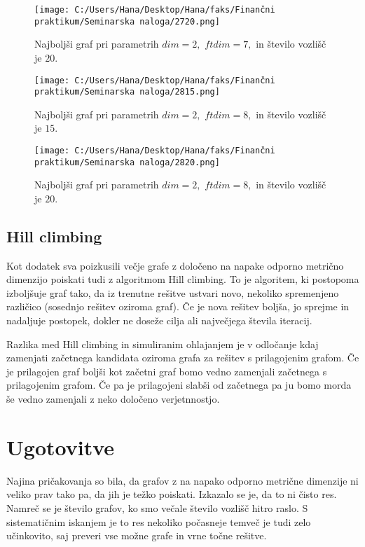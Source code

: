 \documentclass[12pt]{article}
\begin{document}
\begin{figure}[H]
    \centering
    \texttt{[image: C:/Users/Hana/Desktop/Hana/faks/Finančni praktikum/Seminarska naloga/2720.png]}
    \caption{Najboljši graf pri parametrih $dim = 2,$ $ftdim = 7,$ in število vozlišč je $20.$}
    \label{fig:slika2720}
\end{figure}


\begin{figure}[H]
    \centering
    \texttt{[image: C:/Users/Hana/Desktop/Hana/faks/Finančni praktikum/Seminarska naloga/2815.png]}
    \caption{Najboljši graf pri parametrih $dim = 2,$ $ftdim = 8,$ in število vozlišč je $15.$}
    \label{fig:slika2815}
\end{figure}

\begin{figure}[H]
    \centering
    \texttt{[image: C:/Users/Hana/Desktop/Hana/faks/Finančni praktikum/Seminarska naloga/2820.png]}
    \caption{Najboljši graf pri parametrih $dim = 2,$ $ftdim = 8,$ in število vozlišč je $20.$}
    \label{fig:slika2820}
\end{figure}

\subsection{Hill climbing}

Kot dodatek sva poizkusili večje grafe z določeno na napake odporno metrično dimenzijo poiskati tudi z algoritmom
Hill climbing. To je algoritem, ki postopoma izboljšuje graf tako, da iz trenutne rešitve ustvari novo, nekoliko 
spremenjeno različico (sosednjo rešitev oziroma graf). Če je nova rešitev boljša, jo sprejme in nadaljuje postopek, 
dokler ne doseže cilja ali največjega števila iteracij.

Razlika med Hill climbing in simuliranim ohlajanjem je v odločanje kdaj zamenjati začetnega kandidata oziroma grafa 
za rešitev s prilagojenim grafom. Če je prilagojen graf boljši kot začetni graf bomo vedno zamenjali začetnega s 
prilagojenim grafom. Če pa je prilagojeni slabši od začetnega pa ju bomo morda še vedno zamenjali z neko določeno verjetnnostjo.



\section{Ugotovitve}

Najina pričakovanja so bila, da grafov z na napako odporno metrične dimenzije ni veliko prav tako pa, 
da jih je težko poiskati. Izkazalo se je, da to ni čisto res. Namreč se je število grafov, ko smo večale 
število vozlišč hitro raslo. S sistematičnim iskanjem je to res nekoliko počasneje temveč je tudi zelo 
učinkovito, saj preveri vse možne grafe in vrne točne rešitve. 
\end{document}
